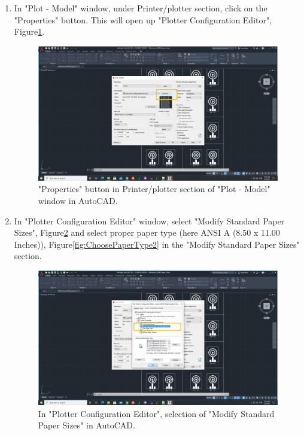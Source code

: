 \begin{enumerate}
	\item In "Plot - Model" window, under Printer/plotter section, click on the "Properties" button. This will open 
	up "Plotter Configuration Editor", Figure\ref{fig:CustomizePaperSize}.
	
	\begin{figure}[H]
		\centering
		\includegraphics[angle=0,origin=c,width = .8\linewidth]{Section_ODMR_Antenna/Figures/CustomizePaperSize.png}
		\caption{"Properties" button in Printer/plotter section of "Plot - Model" window in AutoCAD.}
		\label{fig:CustomizePaperSize}
	\end{figure}
	
	\item In "Plotter Configuration Editor" window, select "Modify Standard Paper Sizes", 
	Figure\ref{fig:ChoosePaperType1} and select proper paper type (here ANSI A (8.50 x 11.00 Inches)),
	Figure\ref{fig:ChoosePaperType2} in the "Modify Standard Paper Sizes" section.

	\begin{figure}[H]
		\centering
		\includegraphics[angle=0,origin=c,width = .8\linewidth]{Section_ODMR_Antenna/Figures/ChoosePaperType1.png}
		\caption{In "Plotter Configuration Editor", selection of "Modify Standard Paper Sizes" in AutoCAD.}
		\label{fig:ChoosePaperType1}
	\end{figure}


\end{enumerate}
